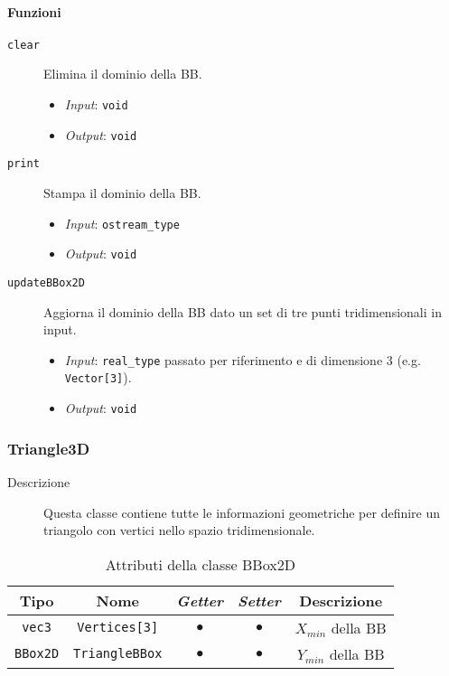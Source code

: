 \paragraph{Funzioni}
\begin{description}
	\item[\texttt{clear}] Elimina il dominio della \ac{BB}.
		\begin{itemize}
			\item \textit{Input}: \texttt{void}
			\item \textit{Output}: \texttt{void}
		\end{itemize}
	\item[\texttt{print}] Stampa il dominio della \ac{BB}.
		\begin{itemize}
			\item \textit{Input}: \texttt{ostream\_type}
			\item \textit{Output}: \texttt{void}
		\end{itemize}
	\item[\texttt{updateBBox2D}] Aggiorna il dominio della \ac{BB} dato un set di tre punti tridimensionali in input.
		\begin{itemize}
			\item \textit{Input}: \texttt{real\_type} passato per riferimento e di dimensione 3 (e.g. \texttt{Vector[3]}).
			\item \textit{Output}: \texttt{void}
		\end{itemize}
\end{description}
%
\subsubsection{Triangle3D}
\begin{description}
	\item[Descrizione] Questa classe contiene tutte le informazioni geometriche per definire un triangolo con vertici nello spazio tridimensionale.
\end{description}
\begin{table}[h!]
	\centering
	\begin{tabular}{|c|c|c|c|c|}
	\hline 
	\textbf{Tipo} & \textbf{Nome} & \textit{\textbf{Getter}} & \textit{\textbf{Setter}} & \textbf{Descrizione} \\ 
	\hline 
	\texttt{vec3} & \texttt{Vertices[3]} & $\bullet$ & $\bullet$ & $X_{min}$ della \ac{BB} \\ 
	\hline 
	\texttt{BBox2D} & \texttt{TriangleBBox} & $\bullet$ & $\bullet$ & $Y_{min}$ della \ac{BB} \\ 
	\hline
\end{tabular}
	\caption{Attributi della classe BBox2D}
	\label{Triangle3D}
\end{table}
